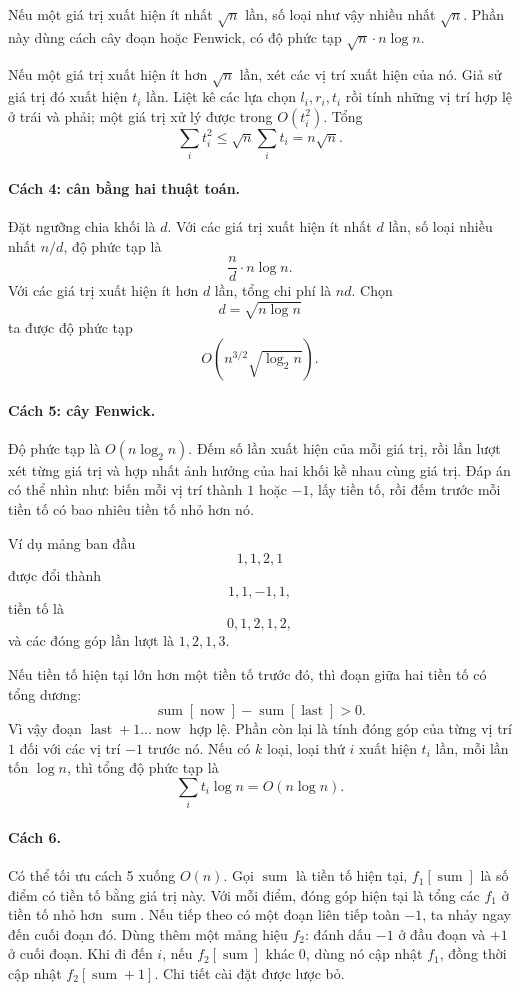 \documentclass[11pt]{article}
\begin{document}
Nếu một giá trị xuất hiện ít nhất $\sqrt n$ lần, số loại như vậy nhiều nhất
$\sqrt n$. Phần này dùng cách cây đoạn hoặc Fenwick, có độ phức tạp
$\sqrt n\cdot n\log n$.

Nếu một giá trị xuất hiện ít hơn $\sqrt n$ lần, xét các vị trí xuất hiện của
nó. Giả sử giá trị đó xuất hiện $t_i$ lần. Liệt kê các lựa chọn
$l_i,r_i,t_i$ rồi tính những vị trí hợp lệ ở trái và phải; một giá trị xử lý
được trong $O(t_i^2)$. Tổng
\[
  \sum_i t_i^2
  \le
  \sqrt n\sum_i t_i
  =
  n\sqrt n.
\]

\paragraph{Cách 4: cân bằng hai thuật toán.}
Đặt ngưỡng chia khối là $d$. Với các giá trị xuất hiện ít nhất $d$ lần, số
loại nhiều nhất $n/d$, độ phức tạp là
\[
  \frac{n}{d}\cdot n\log n.
\]
Với các giá trị xuất hiện ít hơn $d$ lần, tổng chi phí là $nd$. Chọn
\[
  d=\sqrt{n\log n}
\]
ta được độ phức tạp
\[
  O(n^{3/2}\sqrt{\log_2 n}).
\]

\paragraph{Cách 5: cây Fenwick.}
Độ phức tạp là $O(n\log_2 n)$. Đếm số lần xuất hiện của mỗi giá trị, rồi
lần lượt xét từng giá trị và hợp nhất ảnh hưởng của hai khối kề nhau cùng
giá trị. Đáp án có thể nhìn như: biến mỗi vị trí thành $1$ hoặc $-1$, lấy
tiền tố, rồi đếm trước mỗi tiền tố có bao nhiêu tiền tố nhỏ hơn nó.

Ví dụ mảng ban đầu
\[
  1,1,2,1
\]
được đổi thành
\[
  1,1,-1,1,
\]
tiền tố là
\[
  0,1,2,1,2,
\]
và các đóng góp lần lượt là $1,2,1,3$.

Nếu tiền tố hiện tại lớn hơn một tiền tố trước đó, thì đoạn giữa hai tiền tố
có tổng dương:
\[
  \operatorname{sum}[\operatorname{now}]
  -\operatorname{sum}[\operatorname{last}]>0.
\]
Vì vậy đoạn $\operatorname{last}+1\ldots\operatorname{now}$ hợp lệ. Phần còn
lại là tính đóng góp của từng vị trí $1$ đối với các vị trí $-1$ trước nó.
Nếu có $k$ loại, loại thứ $i$ xuất hiện $t_i$ lần, mỗi lần tốn $\log n$, thì
tổng độ phức tạp là
\[
  \sum_i t_i\log n=O(n\log n).
\]

\paragraph{Cách 6.}
Có thể tối ưu cách 5 xuống $O(n)$. Gọi $\operatorname{sum}$ là tiền tố hiện
tại, $f_1[\operatorname{sum}]$ là số điểm có tiền tố bằng giá trị này. Với
mỗi điểm, đóng góp hiện tại là tổng các $f_1$ ở tiền tố nhỏ hơn
$\operatorname{sum}$. Nếu tiếp theo có một đoạn liên tiếp toàn $-1$, ta nhảy
ngay đến cuối đoạn đó. Dùng thêm một mảng hiệu $f_2$: đánh dấu $-1$ ở đầu
đoạn và $+1$ ở cuối đoạn. Khi đi đến $i$, nếu $f_2[\operatorname{sum}]$ khác
$0$, dùng nó cập nhật $f_1$, đồng thời cập nhật $f_2[\operatorname{sum}+1]$.
Chi tiết cài đặt được lược bỏ.
\end{document}
